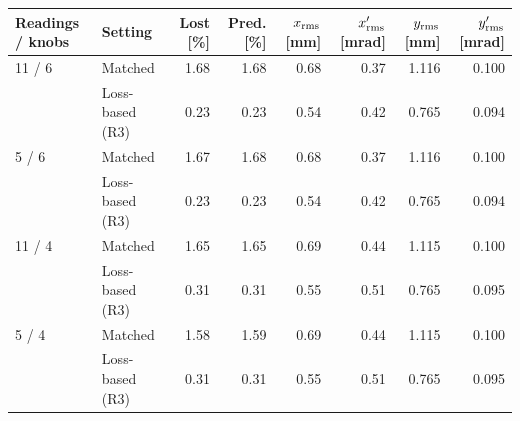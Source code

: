\begin{tabular}{llrrrrrr}\toprule
Readings / knobs & Setting & Lost [\%] & Pred. [\%] & $x_{\rm rms}$ [mm] & $x'_{\rm rms}$ [mrad] & $y_{\rm rms}$ [mm] & $y'_{\rm rms}$ [mrad]\\\midrule
11 / 6 & Matched & 1.68 & 1.68 & 0.68 & 0.37 & 1.116 & 0.100\\
 & Loss-based (R3) & 0.23 & 0.23 & 0.54 & 0.42 & 0.765 & 0.094\\
5 / 6 & Matched & 1.67 & 1.68 & 0.68 & 0.37 & 1.116 & 0.100\\
 & Loss-based (R3) & 0.23 & 0.23 & 0.54 & 0.42 & 0.765 & 0.094\\
11 / 4 & Matched & 1.65 & 1.65 & 0.69 & 0.44 & 1.115 & 0.100\\
 & Loss-based (R3) & 0.31 & 0.31 & 0.55 & 0.51 & 0.765 & 0.095\\
5 / 4 & Matched & 1.58 & 1.59 & 0.69 & 0.44 & 1.115 & 0.100\\
 & Loss-based (R3) & 0.31 & 0.31 & 0.55 & 0.51 & 0.765 & 0.095\\
\bottomrule\end{tabular}
